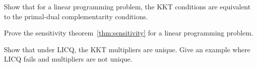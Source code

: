 \begin{exercise}[$\star\star$]
Show that for a linear programming problem, the KKT conditions are equivalent to the
primal-dual complementarity conditions.
\end{exercise}

\begin{exercise}[$\star\star\star$]
Prove the sensitivity theorem~\ref{thm:sensitivity} for a linear programming problem.
\end{exercise}

\begin{exercise}[$\star\star\star$]
Show that under LICQ, the KKT multipliers are unique. Give an example where LICQ
fails and multipliers are not unique.
\end{exercise}
